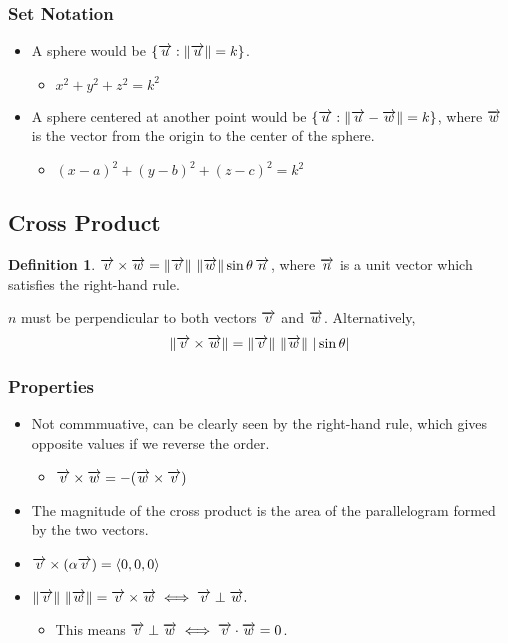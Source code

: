 \documentclass[12pt]{article}
\theoremstyle{plain} %
\theoremstyle{definition}
\theoremstyle{definition}
\newtheorem*{definition}{Definition} %
\theoremstyle{definition}
\theoremstyle{remark}
\newcommand{\vecv}{\vv{v}}
\newcommand{\vecu}{\vv{u}}
\newcommand{\vecw}{\vv{w}}
\newcommand{\angled}[1]{\left\langle {#1} \right\rangle}
\newcommand*{\vv}[1]{\overrightarrow{\mkern0mu#1}}
\renewcommand{\norm}[1]{\left\lVert#1\right\rVert}
\begin{document}
\subsubsection{Set Notation}
\begin{itemize}
    \item A sphere would be $\{\vecu : \norm{\vecu} = k\}$.
    \begin{itemize}
        \item $x^2+y^2+z^2=k^2$
    \end{itemize}
    \item A sphere centered at another point would be $\{\vecu: \norm{\vecu-\vv{w}} = k\}$,
where $\vv{w}$ is the vector from the origin to the center of the sphere.
    \begin{itemize}
        \item $(x-a)^2+(y-b)^2+(z-c)^2=k^2$
    \end{itemize}
\end{itemize}

\subsection{Cross Product}
\begin{definition}
    $\vecv \times \vv{w} = \norm{\vecv} \, \norm{\vv{w}} \sin{\theta} \, \vv{n}$,
    where $\vv{n}$ is a unit vector which satisfies the right-hand rule.
\end{definition}
$n$ must be perpendicular to both vectors $\vecv$ and $\vv{w}$.
Alternatively,
\[  \norm{\vecv \times \vv{w}} = \norm{\vecv} \, \norm{\vv{w}} \, |\sin{\theta}| \]

\subsubsection{Properties}
\begin{itemize}
    \item Not commmuative, can be clearly seen by the right-hand rule, which gives opposite values if we reverse the order.
    \begin{itemize}
        \item $\vecv \times \vecw = -(\vecw \times \vecv)$
    \end{itemize}
    \item The magnitude of the cross product is the area of the parallelogram formed by the two vectors.
    \item $\vecv \times (\alpha \vecv) = \angled{0,0,0}$
    \item $\norm{\vecv} \, \norm{\vecw} = \vecv \times \vecw \iff \vecv \perp \vecw.$
    \begin{itemize}
        \item This means $\vecv \perp \vecw \iff \vecv \cdot \vecw = 0$.
    \end{itemize}
\end{itemize}
\end{document}
